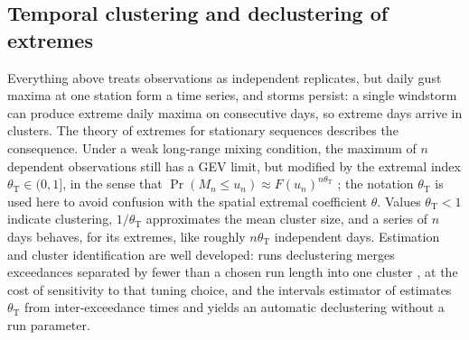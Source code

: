 \subsection{Temporal clustering and declustering of extremes}\label{sec:lit-temporal}

Everything above treats observations as independent replicates, but daily gust maxima at one station form a time series, and storms persist: a single windstorm can produce extreme daily maxima on consecutive days, so extreme days arrive in clusters. The theory of extremes for stationary sequences describes the consequence. Under a weak long-range mixing condition, the maximum of \(n\) dependent observations still has a GEV limit, but modified by the extremal index \(\theta_{\mathrm T}\in(0,1]\), in the sense that \(\Pr(M_n\le u_n)\approx F(u_n)^{n\theta_{\mathrm T}}\) \citep{leadbetter1983,coles2001}; the notation \(\theta_{\mathrm T}\) is used here to avoid confusion with the spatial extremal coefficient \(\theta\). Values \(\theta_{\mathrm T}<1\) indicate clustering, \(1/\theta_{\mathrm T}\) approximates the mean cluster size, and a series of \(n\) days behaves, for its extremes, like roughly \(n\theta_{\mathrm T}\) independent days. Estimation and cluster identification are well developed: runs declustering merges exceedances separated by fewer than a chosen run length into one cluster \citep{coles2001}, at the cost of sensitivity to that tuning choice, and the intervals estimator of \citet{ferro2003} estimates \(\theta_{\mathrm T}\) from inter-exceedance times and yields an automatic declustering without a run parameter.


